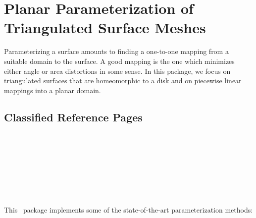 
\chapter{Planar Parameterization of Triangulated Surface Meshes}
\label{chap:surface_mesh_parameterization_ref}


Parameterizing a surface amounts to finding a one-to-one mapping from
a suitable domain to the surface. A good mapping is the one which
minimizes either angle or area distortions in some sense. In this
package, we focus on triangulated surfaces that are homeomorphic to a
disk and on piecewise linear mappings into a planar domain.



\section{Classified Reference Pages}


  \\



  \\
  \\
  \\
  \\
  \\



This \cgal\ package implements some of
the state-of-the-art parameterization methods:

